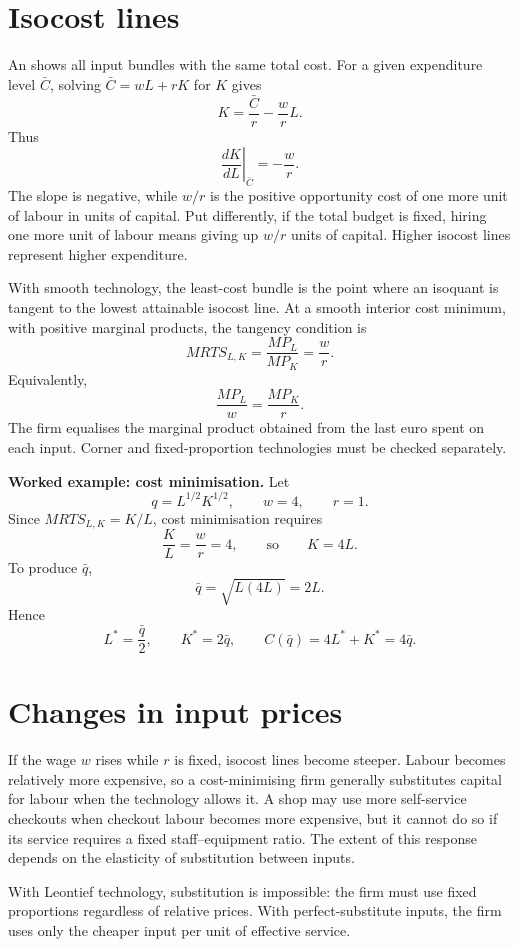 \section{Isocost lines}

An  shows all input bundles with the same total cost.
For a given expenditure level $\bar C$, solving $\bar C=wL+rK$ for $K$ gives
\[
K=\frac{\bar C}{r}-\frac{w}{r}L.
\]
Thus
\[
\left.\frac{dK}{dL}\right|_{\bar C}=-\frac{w}{r}.
\]
The slope is negative, while $w/r$ is the positive opportunity cost of one
more unit of labour in units of capital. Put differently, if the total budget
is fixed, hiring one more unit of labour means giving up $w/r$ units of
capital. Higher isocost lines represent higher expenditure.

With smooth technology, the least-cost bundle is the point where an isoquant
is tangent to the lowest attainable isocost line. At a smooth interior cost
minimum, with positive marginal products, the tangency condition is
\[
MRTS_{L,K}=\frac{MP_L}{MP_K}=\frac{w}{r}.
\]
Equivalently,
\[
\frac{MP_L}{w}=\frac{MP_K}{r}.
\]
The firm equalises the marginal product obtained from the last euro spent on
each input. Corner and fixed-proportion technologies must be checked
separately.

\begin{keyidea}
\textbf{Worked example: cost minimisation.}
Let
\[
q=L^{1/2}K^{1/2},
\qquad
w=4,
\qquad
r=1.
\]
Since $MRTS_{L,K}=K/L$, cost minimisation requires
\[
\frac{K}{L}=\frac{w}{r}=4,
\qquad\text{so}\qquad K=4L.
\]
To produce $\bar q$,
\[
\bar q=\sqrt{L(4L)}=2L.
\]
Hence
\[
L^*=\frac{\bar q}{2},
\qquad
K^*=2\bar q,
\qquad
C(\bar q)=4L^*+K^*=4\bar q.
\]
\end{keyidea}

\section{Changes in input prices}

If the wage $w$ rises while $r$ is fixed, isocost lines become steeper.
Labour becomes relatively more expensive, so a cost-minimising firm generally
substitutes capital for labour when the technology allows it. A shop may use
more self-service checkouts when checkout labour becomes more expensive, but
it cannot do so if its service requires a fixed staff--equipment ratio. The
extent of this response depends on the elasticity of substitution between
inputs.

With Leontief technology, substitution is impossible: the firm must use fixed proportions regardless of relative prices. With perfect-substitute inputs, the firm uses only the cheaper input per unit of effective service.

